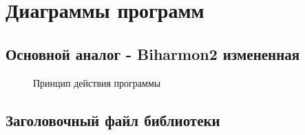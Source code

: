 \chapter{Диаграммы программ}
\section{Основной аналог - Biharmon2 измененная}
%
\begin{figure}[hp]
\begin{small}

\end{small}
\caption{Принцип действия программы}
\end{figure}
\section{Заголовочный файл библиотеки}
\begin{spacing}{0.9}

\end{spacing}

